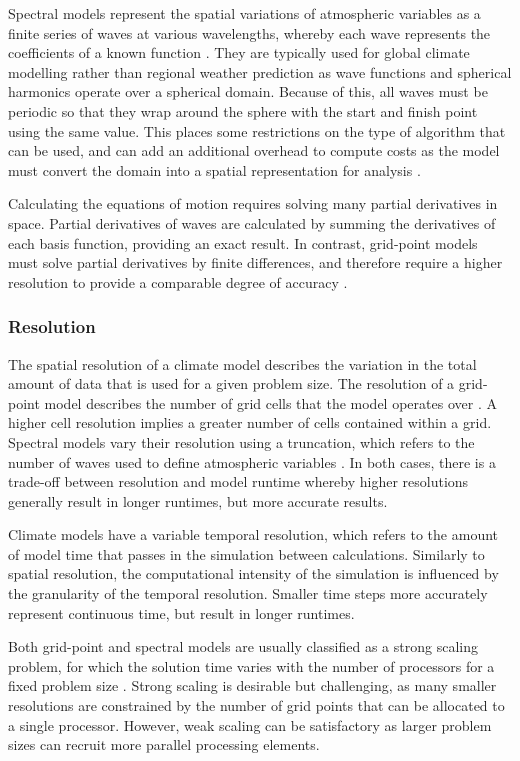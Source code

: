 \documentclass[a4paper,11pt]{report}
\begin{document}
\par
Spectral models represent the spatial variations of atmospheric variables as a finite series of waves at various wavelengths, whereby each wave represents the coefficients of a known function \cite{bourke1988spectral}. They are typically used for global climate modelling rather than regional weather prediction as wave functions and spherical harmonics operate over a spherical domain. Because of this, all waves must be periodic so that they wrap around the sphere with the start and finish point using the same value. This places some restrictions on the type of algorithm that can be used, and can add an additional overhead to compute costs as the model must convert the domain into a spatial representation for analysis \cite{orszag1974fourier}. 
\par
Calculating the equations of motion requires solving many partial derivatives in space. Partial derivatives of waves are calculated by summing the derivatives of each basis function, providing an exact result. In contrast, grid-point models must solve partial derivatives by finite differences, and therefore require a higher resolution to provide a comparable degree of accuracy \cite{bart1998coordinate}. 

\subsubsection{Resolution} 
The spatial resolution of a climate model describes the variation in the total amount of data that is used for a given problem size. The resolution of a grid-point model describes the number of grid cells that the model operates over \cite{goosse2010introduction}. A higher cell resolution implies a greater number of cells contained within a grid. Spectral models vary their resolution using a truncation, which refers to the number of waves used to define atmospheric variables \cite{goosse2010introduction}. In both cases, there is a trade-off between resolution and model runtime whereby higher resolutions generally result in longer runtimes, but more accurate results. 
\par
Climate models have a variable temporal resolution, which refers to the amount of model time that passes in the simulation between calculations. Similarly to spatial resolution, the computational intensity of the simulation is influenced by the granularity of the temporal resolution. Smaller time steps more accurately represent continuous time, but result in longer runtimes.
\par
Both grid-point and spectral models are usually classified as a strong scaling problem, for which the solution time varies with the number of processors for a fixed problem size \cite{colella2007performance}.  Strong scaling is desirable but challenging, as many smaller resolutions are constrained by the number of grid points that can be allocated to a single processor. However, weak scaling can be satisfactory as larger problem sizes can recruit more parallel processing elements.
\end{document}
